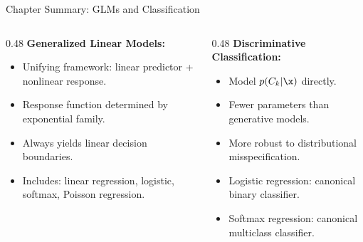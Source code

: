 \begin{frame}{Chapter Summary: GLMs and Classification}
  \begin{columns}[T]
    \begin{column}{0.48\textwidth}
      \textbf{Generalized Linear Models:}
      \begin{itemize}
        \item Unifying framework: linear predictor + nonlinear response.
        \item Response function determined by exponential family.
        \item Always yields linear decision boundaries.
        \item Includes: linear regression, logistic, softmax, Poisson regression.
      \end{itemize}
    \end{column}
    \begin{column}{0.48\textwidth}
      \textbf{Discriminative Classification:}
      \begin{itemize}
        \item Model $p(C_k|\x)$ directly.
        \item Fewer parameters than generative models.
        \item More robust to distributional misspecification.
        \item Logistic regression: canonical binary classifier.
        \item Softmax regression: canonical multiclass classifier.
      \end{itemize}
    \end{column}
  \end{columns}
\end{frame}

